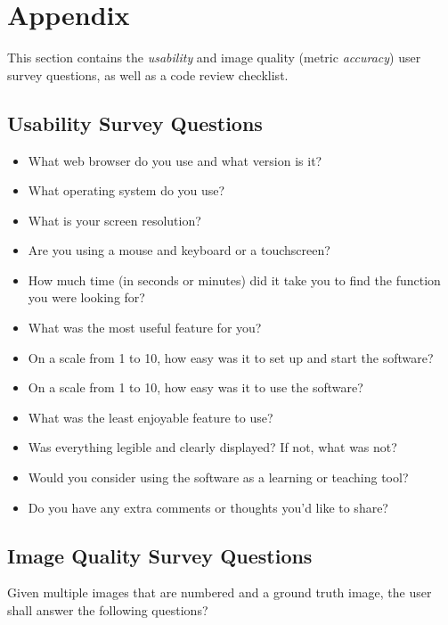 \documentclass[12pt, titlepage]{article}
\begin{document}
\newpage
\clearpage




\newpage

\section{Appendix}

This section contains the \textit{usability} and image quality (metric \textit{accuracy}) 
user survey questions, as well as a code review checklist.

\subsection{Usability Survey Questions} \label{survey_usability}

\begin{itemize}
  \item{What web browser do you use and what version is it?}
  \item{What operating system do you use?}
  \item{What is your screen resolution?}
  \item{Are you using a mouse and keyboard or a touchscreen?}
  \item{How much time (in seconds or minutes) did it take you to find the function you were looking for?}
  \item{What was the most useful feature for you?}
  \item{On a scale from 1 to 10, how easy was it to set up and start the software?}
  \item{On a scale from 1 to 10, how easy was it to use the software?}
  \item{What was the least enjoyable feature to use?}
  \item{Was everything legible and clearly displayed? If not, what was not?}
  \item{Would you consider using the software as a learning or teaching tool?}
  \item{Do you have any extra comments or thoughts you'd like to share?}
\end{itemize}

\subsection{Image Quality Survey Questions} \label{survey_metric}
Given multiple images that are numbered and a ground truth image, 
the user shall answer the following questions?
\end{document}

